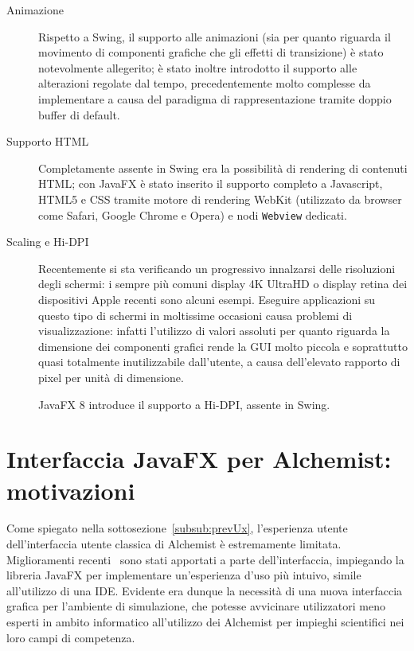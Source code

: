 \begin{description}
              \item[Animazione] Rispetto a Swing, il supporto alle animazioni (sia per quanto riguarda il movimento di componenti grafiche che gli effetti di transizione) è stato notevolmente allegerito; è stato inoltre introdotto il supporto alle alterazioni regolate dal tempo, precedentemente molto complesse da implementare a causa del paradigma di rappresentazione tramite doppio buffer di default.

              \item[Supporto HTML] Completamente assente in Swing era la possibilità di rendering di contenuti HTML; con JavaFX è stato inserito il supporto completo a Javascript, HTML5 e CSS tramite motore di rendering WebKit (utilizzato da browser come Safari, Google Chrome e Opera) e nodi \texttt{Webview} dedicati.

              \item[Scaling e Hi-DPI] Recentemente si sta verificando un progressivo innalzarsi delle risoluzioni degli schermi: i sempre più comuni display 4K UltraHD o display retina dei dispositivi Apple recenti sono alcuni esempi.
              Eseguire applicazioni su questo tipo di schermi in moltissime occasioni causa problemi di visualizzazione: infatti l'utilizzo di valori assoluti per quanto riguarda la dimensione dei componenti grafici rende la GUI molto piccola e soprattutto quasi totalmente inutilizzabile dall’utente, a causa dell'elevato rapporto di pixel per unità di dimensione.

              JavaFX 8 introduce il supporto a Hi-DPI, assente in Swing.
            \end{description}

    \section{Interfaccia JavaFX per Alchemist: motivazioni}\label{sec:motivi}
        Come spiegato nella sottosezione~\vref{subsub:prevUx}, l'esperienza utente dell'interfaccia utente classica di Alchemist è estremamente limitata.
        Miglioramenti recenti~\cite{casadio} sono stati apportati a parte dell'interfaccia, impiegando la libreria JavaFX per implementare un'esperienza d'uso più intuivo, simile all'utilizzo di una IDE.
        Evidente era dunque la necessità di una nuova interfaccia grafica per l'ambiente di simulazione, che potesse avvicinare utilizzatori meno esperti in ambito informatico all'utilizzo dei Alchemist per impieghi scientifici nei loro campi di competenza.

